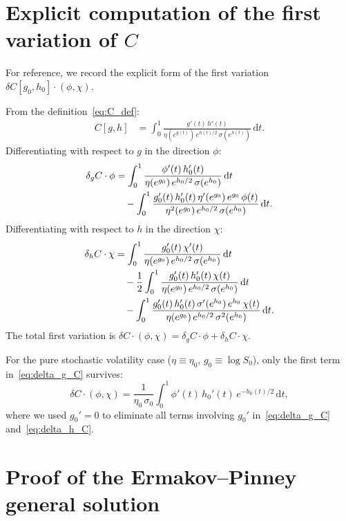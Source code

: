 \documentclass[11pt]{article}
\theoremstyle{definition}
\newcommand{\dd}{\mathrm{d}}
\begin{document}
\appendix
\section{Explicit computation of the first variation of $C$}\label{app:deltaC}

For reference, we record the explicit form of the first variation $\delta C[g_0, h_0]\cdot(\phi, \chi)$.

From the definition~\eqref{eq:C_def}:
\begin{align}
  C[g,h] &= \int_0^1 \frac{g'(t)\,h'(t)}{\eta(e^{g(t)})\,e^{h(t)/2}\,\sigma(e^{h(t)})}\,\dd t.
\end{align}
Differentiating with respect to $g$ in the direction $\phi$:
\begin{align}
  \delta_g C \cdot \phi &= \int_0^1 \frac{\phi'(t)\,h_0'(t)}{\eta(e^{g_0})\,e^{h_0/2}\,\sigma(e^{h_0})}\,\dd t \notag\\
  &\quad - \int_0^1 \frac{g_0'(t)\,h_0'(t)\,\eta'(e^{g_0})\,e^{g_0}\,\phi(t)}{\eta^2(e^{g_0})\,e^{h_0/2}\,\sigma(e^{h_0})}\,\dd t. \label{eq:delta_g_C}
\end{align}
Differentiating with respect to $h$ in the direction $\chi$:
\begin{align}
  \delta_h C \cdot \chi &= \int_0^1 \frac{g_0'(t)\,\chi'(t)}{\eta(e^{g_0})\,e^{h_0/2}\,\sigma(e^{h_0})}\,\dd t \notag\\
  &\quad - \frac{1}{2}\int_0^1 \frac{g_0'(t)\,h_0'(t)\,\chi(t)}{\eta(e^{g_0})\,e^{h_0/2}\,\sigma(e^{h_0})}\,\dd t \notag\\
  &\quad - \int_0^1 \frac{g_0'(t)\,h_0'(t)\,\sigma'(e^{h_0})\,e^{h_0}\,\chi(t)}{\eta(e^{g_0})\,e^{h_0/2}\,\sigma^2(e^{h_0})}\,\dd t. \label{eq:delta_h_C}
\end{align}
The total first variation is $\delta C \cdot (\phi, \chi) = \delta_g C \cdot \phi + \delta_h C \cdot \chi$.

\medskip
For the pure stochastic volatility case ($\eta \equiv \eta_0$, $g_0 \equiv \log S_0$), only the first term in~\eqref{eq:delta_g_C} survives:
\begin{equation}
  \delta C \cdot (\phi, \chi) = \frac{1}{\eta_0\,\sigma_0}\int_0^1 \phi'(t)\,h_0'(t)\,e^{-h_0(t)/2}\,\dd t,
\end{equation}
where we used $g_0' = 0$ to eliminate all terms involving $g_0'$ in~\eqref{eq:delta_g_C} and~\eqref{eq:delta_h_C}.

\section{Proof of the Ermakov--Pinney general solution}\label{app:ermakov}
\end{document}
